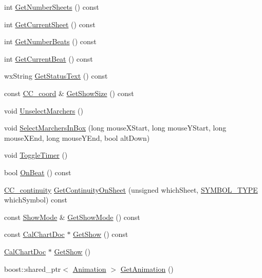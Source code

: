 \begin{DoxyCompactItemize}
int \hyperlink{a00015_aaf26cfb08a4e889581e4ac3f247c3f4f}{Get\-Number\-Sheets} () const 
\item 
int \hyperlink{a00015_a11dea16d04465f72ab1ffa98f4431bd1}{Get\-Current\-Sheet} () const 
\item 
int \hyperlink{a00015_aa9db8beb597d821c9988a9866406c09f}{Get\-Number\-Beats} () const 
\item 
int \hyperlink{a00015_aca12f7783c48af2533482b26d3472b23}{Get\-Current\-Beat} () const 
\item 
wx\-String \hyperlink{a00015_ae5641c2fa7dfbef1ba386bebbeb54a63}{Get\-Status\-Text} () const 
\item 
const \hyperlink{a00029}{C\-C\-\_\-coord} \& \hyperlink{a00015_a4ee016ca6b0925947a8ef86494b47071}{Get\-Show\-Size} () const 
\item 
void \hyperlink{a00015_a1d34cc6101fa85b2ac017600068cc598}{Unselect\-Marchers} ()
\item 
void \hyperlink{a00015_a7b967748023fa51cbacadb320569d998}{Select\-Marchers\-In\-Box} (long mouse\-X\-Start, long mouse\-Y\-Start, long mouse\-X\-End, long mouse\-Y\-End, bool alt\-Down)
\item 
void \hyperlink{a00015_aa93a3db65a7e779d200e89b4a9f91b51}{Toggle\-Timer} ()
\item 
bool \hyperlink{a00015_a574513cf3b5edc1b190864e0c038f328}{On\-Beat} () const 
\item 
\hyperlink{a00027}{C\-C\-\_\-continuity} \hyperlink{a00015_aad7ff439a3d263762b7f6d529bc6cd75}{Get\-Continuity\-On\-Sheet} (unsigned which\-Sheet, \hyperlink{a00216_a68cd84e0300be6f9ff4474682762c9ee}{S\-Y\-M\-B\-O\-L\-\_\-\-T\-Y\-P\-E} which\-Symbol) const 
\item 
const \hyperlink{a00140}{Show\-Mode} \& \hyperlink{a00015_aaf39bba807352809c664721653ea5172}{Get\-Show\-Mode} () const 
\item 
const \hyperlink{a00020}{Cal\-Chart\-Doc} $\ast$ \hyperlink{a00015_aadc2f1190af3d96a1238150a82266bcd}{Get\-Show} () const 
\item 
\hyperlink{a00020}{Cal\-Chart\-Doc} $\ast$ \hyperlink{a00015_a7764c4557b1cc1934b43046f18d51077}{Get\-Show} ()
\item 
boost\-::shared\-\_\-ptr$<$ \hyperlink{a00010}{Animation} $>$ \hyperlink{a00015_aff90f8db8a467972616723eced1a7e89}{Get\-Animation} ()
\end{DoxyCompactItemize}

